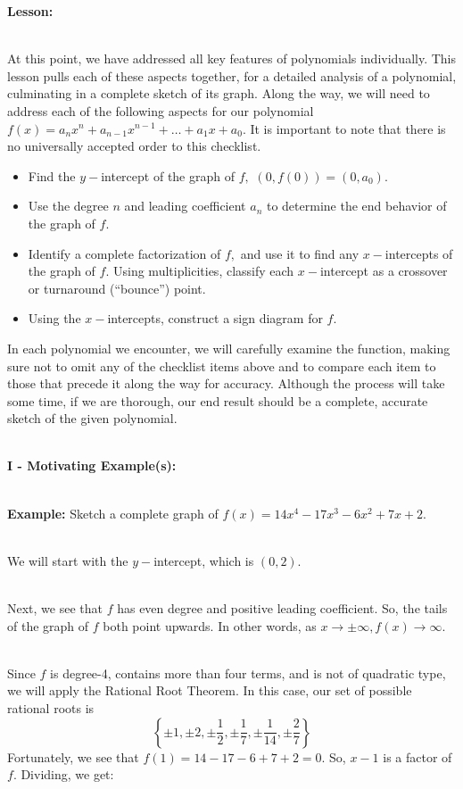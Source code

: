 \documentclass[12pt]{article}
\theoremstyle{definition}
\begin{document}
{\bf Lesson:}\\
\ \par
At this point, we have addressed all key features of polynomials individually.  This lesson pulls each of these aspects together, for a detailed analysis of a polynomial, culminating in a complete sketch of its graph.  Along the way, we will need to address each of the following aspects for our polynomial $f(x)=a_nx^n+a_{n-1}x^{n-1}+\ldots+a_1x+a_0$.  It is important to note that there is no universally accepted order to this checklist.
\begin{itemize}
	\item Find the $y-$intercept of the graph of $f,$ $(0,f(0))=(0,a_0)$.
	\item Use the degree $n$ and leading coefficient $a_n$ to determine the end behavior of the graph of $f$.
	\item Identify a complete factorization of $f,$ and use it to find any $x-$intercepts of the graph of $f$.  Using multiplicities, classify each $x-$intercept as a crossover or turnaround (``bounce'') point.
	\item Using the $x-$intercepts, construct a sign diagram for $f$.
\end{itemize}
In each polynomial we encounter, we will carefully examine the function, making sure not to omit any of the checklist items above and to compare each item to those that precede it along the way for accuracy.  Although the process will take some time, if we are thorough, our end result should be a complete, accurate sketch of the given polynomial.\\
\ \par
{\bf I - Motivating Example(s):}\\
\ \par
{\bf Example:}  Sketch a complete graph of $f(x)=14x^4-17x^3-6x^2+7x+2$.\\
\ \par
We will start with the $y-$intercept, which is $(0,2)$.\\
\ \par
Next, we see that $f$ has even degree and positive leading coefficient.  So, the tails of the graph of $f$ both point upwards.  In other words, as $x\rightarrow\pm\infty, f(x)\rightarrow\infty$.\\
\ \par
Since $f$ is degree-4, contains more than four terms, and is not of quadratic type, we will apply the Rational Root Theorem.  In this case, our set of possible rational roots is
$$\left\{\pm 1, \pm 2, \pm \frac{1}{2}, \pm \frac{1}{7}, \pm \frac{1}{14}, \pm \frac{2}{7}\right\}$$
Fortunately, we see that $f(1)=14-17-6+7+2=0$.  So, $x-1$ is a factor of $f$.  Dividing, we get:
\begin{multicols}{2}

\columnbreak

\end{multicols}
\end{document}
